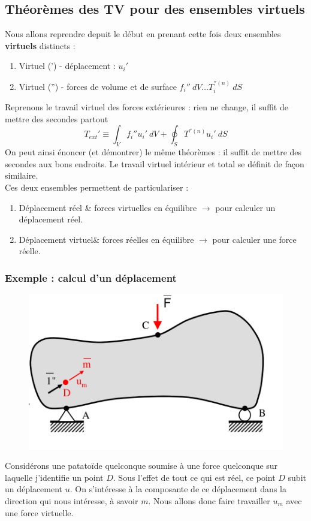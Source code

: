 	\subsection{Théorèmes des TV pour des ensembles virtuels}
	Nous allons reprendre depuit le début en prenant cette fois deux 
	ensembles \textbf{virtuels} distincts :
	\begin{enumerate}
	\item Virtuel (') - déplacement : $u_i'$
	\item Virtuel ('') - forces de volume et de surface $f_i''\ dV\dots 
	T_i^{''(n)}\ dS$
	\end{enumerate}
	Reprenons le travail virtuel des forces extérieures : rien ne change, 
	il suffit de mettre des secondes partout
	\begin{equation}
	T_{ext}' \equiv \int_V f_i''u_i'\ dV + \oint_S T^{''(n)}u_i'\ dS
	\end{equation}
	On peut ainsi énoncer (et démontrer) le même théorèmes : il suffit 
	de mettre des secondes aux bons endroits. Le travail virtuel 
	intérieur et total se définit de façon similaire.\\
	
	Ces deux ensembles permettent de particulariser :
	\begin{enumerate}
	\item Déplacement réel \& forces virtuelles en équilibre $\rightarrow$ 
	pour calculer un déplacement réel.
	\item Déplacement virtuel\& forces réelles en équilibre $\rightarrow$ 
	pour calculer une force réelle.	
	\end{enumerate}
	
		\newpage
		\subsubsection{Exemple : calcul d'un déplacement}
		\begin{figure}
		\vspace{-5mm}
		\includegraphics[scale=0.4]{ch9/image2.png}
		\end{figure}	
		Considérons une patatoïde quelconque soumise à une force 
		quelconque sur laquelle j'identifie un point $D$. Sous l'effet de 
		tout ce qui est réel, ce point $D$ subit un déplacement $u$. On 
		s'intéresse à la composante de ce déplacement dans la direction 
		qui nous intéresse, à savoir $m$. Nous allons donc faire travailler 
		$u_m$ avec une force virtuelle.\\
		
